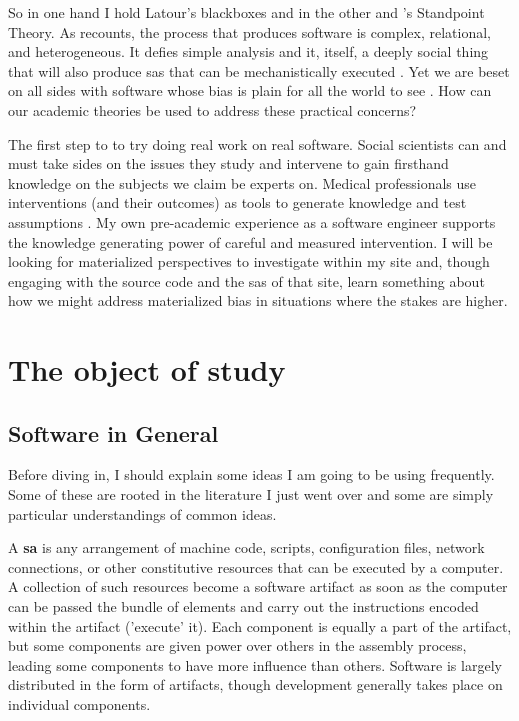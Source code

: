 \documentclass[a4paper,man,natbib,floatsintext]{apa6}
\begin{document}
  So in one hand I hold Latour's blackboxes and in the other \citet{Harding1992-od} and \citet{Haraway1988-nh}'s Standpoint Theory. As \citet{Mackenzie2006-hb} recounts, the process that produces software is complex, relational, and heterogeneous. It defies simple analysis and it, itself, a deeply social thing that will also produce \glspl{sa} that can be mechanistically executed \citep{Cox2013-zo}. Yet we are beset on all sides with software whose bias is plain for all the world to see \citep{Bivens2017-tc,Dean2010-lk,Elish2019-ls,Eubanks2018-hc,Schull2012-nc}. How can our academic theories be used to address these practical concerns?

  The first step to to try doing real work on real software. Social scientists can and must take sides on the issues they study and intervene to gain firsthand knowledge on the subjects we claim be experts on. Medical professionals use interventions (and their outcomes) as tools to generate knowledge and test assumptions \citep{Zuiderent-Jerak2015-go}. My own pre-academic experience as a software engineer supports the knowledge generating power of careful and measured intervention. I will be looking for materialized perspectives to investigate within my site and, though engaging with the source code and the \glspl{sa} of that site, learn something about how we might address materialized bias in situations where the stakes are higher.

  \newpage

  
  \section{The object of study}
  \subsection{Software in General}
  Before diving in, I should explain some ideas I am going to be using frequently. Some of these are rooted in the literature I just went over and some are simply particular understandings of common ideas.

  A \textbf{\gls{sa}} is any arrangement of machine code, scripts, configuration files, network connections, or other constitutive resources that can be executed by a computer. A collection of such resources become a software artifact as soon as the computer can be passed the bundle of elements and carry out the instructions encoded within the artifact ('execute' it). Each component is equally a part of the artifact, but some components are given power over others in the assembly process, leading some components to have more influence than others. Software is largely distributed in the form of artifacts, though development generally takes place on individual components. 
\end{document}
